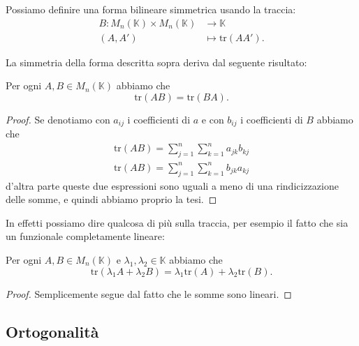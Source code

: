 \documentclass[11pt]{scrartcl}
\newcommand{\tr}[1]{\text{tr}\!\left(#1\right)}
\newcommand{\KK}{\mathbb{K}}
\begin{document}
	\begin{example}[Traccia]
		Possiamo definire una forma bilineare simmetrica usando la traccia:
		\begin{align*}
			B:M_n(\KK)\times M_n(\KK) & \to \KK \\
			(A,A') & \mapsto \tr{AA'}.
		\end{align*}
	\end{example}
	
	La simmetria della forma descritta sopra deriva dal seguente risultato:
	\begin{lemma}
		Per ogni $A,B\in M_n(\KK)$ abbiamo che
		$$\tr{AB}=\tr{BA}.$$
	\end{lemma}
	\begin{proof}
		Se denotiamo con $a_{ij}$ i coefficienti di $a$ e con $b_{ij}$ i coefficienti di $B$ abbiamo che
		\begin{gather*}
			\tr{AB}=\sum_{j=1}^{n}\sum_{k=1}^{n}a_{jk}b_{kj} \\
			\tr{AB}=\sum_{j=1}^{n}\sum_{k=1}^{n}b_{jk}a_{kj}
		\end{gather*}
		d'altra parte queste due espressioni sono uguali a meno di una rindicizzazione delle somme, e quindi abbiamo proprio la tesi.
	\end{proof}
	
	In effetti possiamo dire qualcosa di più sulla traccia, per esempio il fatto che sia un funzionale completamente lineare:
	\begin{lemma}
		Per ogni $A,B\in M_n(\KK)$ e $\lambda_1,\lambda_2\in \KK$ abbiamo che 
		$$\tr{\lambda_1A+\lambda_2B}=\lambda_1\tr{A}+\lambda_2\tr{B}.$$
	\end{lemma}
	\begin{proof}
		Semplicemente segue dal fatto che le somme sono lineari.
	\end{proof}
	
	\subsection{Ortogonalità}
	
\end{document}
